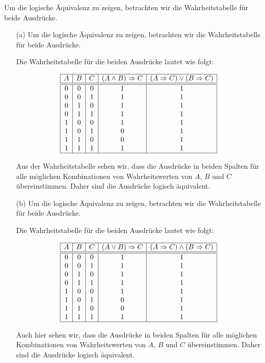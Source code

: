 Um die logische Äquivalenz zu zeigen, betrachten wir die Wahrheitstabelle für beide Ausdrücke.

\begin{enumerate}
    \item[(a)] Um die logische Äquivalenz zu zeigen, betrachten wir die Wahrheitstabelle für beide Ausdrücke.
    
    Die Wahrheitstabelle für die beiden Ausdrücke lautet wie folgt:
    
    \[
    \begin{array}{|c|c|c|c|c|}
    \hline
    A & B & C & (A \land B) \Rightarrow C & (A \Rightarrow C) \lor (B \Rightarrow C) \\
    \hline
    \hline
    0 & 0 & 0 & 1 & 1 \\
    0 & 0 & 1 & 1 & 1 \\
    0 & 1 & 0 & 1 & 1 \\
    0 & 1 & 1 & 1 & 1 \\
    1 & 0 & 0 & 1 & 1 \\
    1 & 0 & 1 & 0 & 1 \\
    1 & 1 & 0 & 0 & 1 \\
    1 & 1 & 1 & 1 & 1 \\
    \hline
    \end{array}
    \]
    
    Aus der Wahrheitstabelle sehen wir, dass die Ausdrücke in beiden Spalten für alle möglichen Kombinationen von Wahrheitswerten von \( A \), \( B \) und \( C \) übereinstimmen. Daher sind die Ausdrücke logisch äquivalent.
    
    \item[(b)] Um die logische Äquivalenz zu zeigen, betrachten wir die Wahrheitstabelle für beide Ausdrücke.
    
    Die Wahrheitstabelle für die beiden Ausdrücke lautet wie folgt:
    
    \[
    \begin{array}{|c|c|c|c|c|}
    \hline
    A & B & C & (A \lor B) \Rightarrow C & (A \Rightarrow C) \land (B \Rightarrow C) \\
    \hline
    \hline
    0 & 0 & 0 & 1 & 1 \\
    0 & 0 & 1 & 1 & 1 \\
    0 & 1 & 0 & 1 & 1 \\
    0 & 1 & 1 & 1 & 1 \\
    1 & 0 & 0 & 1 & 1 \\
    1 & 0 & 1 & 0 & 1 \\
    1 & 1 & 0 & 0 & 1 \\
    1 & 1 & 1 & 1 & 1 \\
    \hline
    \end{array}
    \]
    
    Auch hier sehen wir, dass die Ausdrücke in beiden Spalten für alle möglichen Kombinationen von Wahrheitswerten von \( A \), \( B \) und \( C \) übereinstimmen. Daher sind die Ausdrücke logisch äquivalent.
\end{enumerate}
